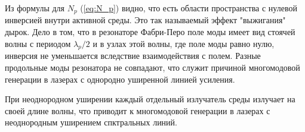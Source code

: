 \documentclass[12pt]{article}
\begin{document}
	Из формулы для $N_p$ (\ref{eq:N_p}) видно, что есть области пространства с нулевой инверсией внутри активной среды. Это так называемый эффект "выжигания" дырок. Дело в том, что в резонаторе Фабри-Перо поле моды имеет вид стоячей волны с периодом $\lambda_p/2$ и в узлах этой волны, где поле моды равно нулю, инверсия не уменьшается вследствие взаимодействия с полем. Разные продольные моды резонатора не совпадают, что служит причиной многомодовой генерации в лазерах с однородно уширенной линией усиления.

	При неоднородном уширении каждый отдельный излучатель среды излучает на своей длине волны, что приводит к многомодовой генерации в лазерах с неоднородным уширением спктральных линий.
\end{document}
